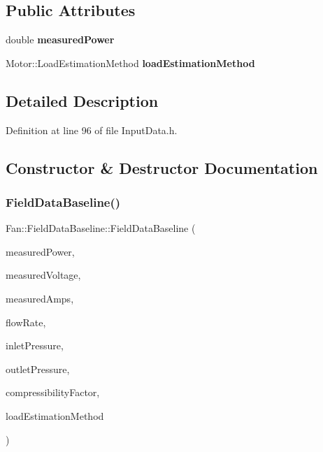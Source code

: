 \subsection*{Public Attributes}
\begin{DoxyCompactItemize}
\item 
\mbox{\label{struct_fan_1_1_field_data_baseline_a72db904713df81b8c4e8edc5555e9061}} 
double {\bfseries measured\+Power}
\item 
\mbox{\label{struct_fan_1_1_field_data_baseline_ad30a17fe79073102a5290a1edd0ac3e9}} 
Motor\+::\+Load\+Estimation\+Method {\bfseries load\+Estimation\+Method}
\end{DoxyCompactItemize}


\subsection{Detailed Description}


Definition at line 96 of file Input\+Data.\+h.



\subsection{Constructor \& Destructor Documentation}
\mbox{\label{struct_fan_1_1_field_data_baseline_a99f4a04d6960b3fe664b991581da87d3}} 
\subsubsection{\texorpdfstring{Field\+Data\+Baseline()}{FieldDataBaseline()}\hspace{0.1cm}{\footnotesize\ttfamily [1/3]}}
{\footnotesize\ttfamily Fan\+::\+Field\+Data\+Baseline\+::\+Field\+Data\+Baseline (\begin{DoxyParamCaption}\item[{const double}]{measured\+Power,  }\item[{const double}]{measured\+Voltage,  }\item[{const double}]{measured\+Amps,  }\item[{const double}]{flow\+Rate,  }\item[{const double}]{inlet\+Pressure,  }\item[{const double}]{outlet\+Pressure,  }\item[{const double}]{compressibility\+Factor,  }\item[{Motor\+::\+Load\+Estimation\+Method}]{load\+Estimation\+Method }\end{DoxyParamCaption})\hspace{0.3cm}{\ttfamily [inline]}}


